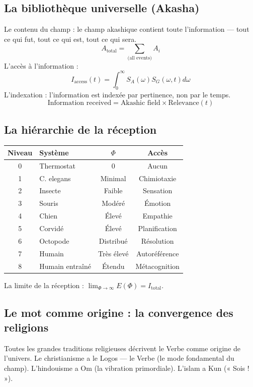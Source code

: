 \subsection{La bibliothèque universelle (Akasha)}
Le contenu du champ : le champ akashique contient toute l'information --- tout ce qui fut, tout ce qui est, tout ce qui sera.
\begin{equation}
A_{\text{total}} = \sum_{\text{(all events)}} A_i
\end{equation}
L'accès à l'information :
\begin{equation}
I_{\text{access}}(t) = \int_0^\infty S_A(\omega) S_G(\omega, t) d\omega
\end{equation}
L'indexation : l'information est indexée par pertinence, non par le temps.
\begin{equation}
\text{Information received} = \text{Akashic field} \times \text{Relevance}(t)
\end{equation}

\subsection{La hiérarchie de la réception}
\begin{table}[H]
\centering
\begin{tabular}{@{}clcc@{}}
\toprule
\textbf{Niveau} & \textbf{Système} & \textbf{$\Phi$} & \textbf{Accès} \\ \midrule
0 & Thermostat & 0 & Aucun \\
1 & C. elegans & Minimal & Chimiotaxie \\
2 & Insecte & Faible & Sensation \\
3 & Souris & Modéré & Émotion \\
4 & Chien & Élevé & Empathie \\
5 & Corvidé & Élevé & Planification \\
6 & Octopode & Distribué & Résolution \\
7 & Humain & Très élevé & Autoréférence \\
8 & Humain entraîné & Étendu & Métacognition \\ \bottomrule
\end{tabular}
\end{table}
La limite de la réception : $\lim_{\Phi \rightarrow \infty} E(\Phi) = I_{\text{total}}$.

\subsection{Le mot comme origine : la convergence des religions}
Toutes les grandes traditions religieuses décrivent le Verbe comme origine de l'univers. Le christianisme a le Logos --- le Verbe (le mode fondamental du champ). L'hindouisme a Om (la vibration primordiale). L'islam a Kun (« Sois ! »).

